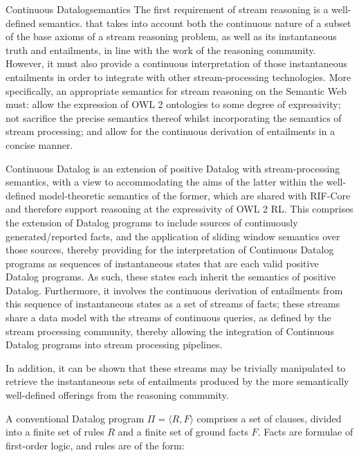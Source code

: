 \begin{nestedsection}{Continuous Datalog}{semantics}
The first requirement of stream reasoning is a well-defined semantics.
that takes into account both the continuous nature of a subset of the
base axioms of a stream reasoning problem, as well as its
instantaneous truth and entailments, in line with the work of the
reasoning community.  However, it must also provide a continuous
interpretation of those instantaneous entailments in order to
integrate with other stream-processing technologies.  More
specifically, an appropriate semantics for stream reasoning on the
Semantic Web must: allow the expression of OWL 2 ontologies to some
degree of expressivity; not sacrifice the precise semantics thereof
whilst incorporating the semantics of stream processing; and allow for
the continuous derivation of entailments in a concise manner.

Continuous Datalog is an extension of positive Datalog with
stream-processing semantics, with a view to accommodating the aims of
the latter within the well-defined model-theoretic semantics of the
former, which are shared with RIF-Core \cite{w3crifbld} and therefore
support reasoning at the expressivity of OWL 2 RL.  This comprises the
extension of Datalog programs to include sources of continuously
generated/reported facts, and the application of sliding window
semantics over those sources, thereby providing for the interpretation
of Continuous Datalog programs as sequences of instantaneous states
that are each valid positive Datalog programs.  As such, these states
each inherit the semantics of positive Datalog.  Furthermore, it
involves the continuous derivation of entailments from this sequence
of instantaneous states as a set of streams of facts; these streams
share a data model with the streams of continuous queries, as defined
by the stream processing community, thereby allowing the integration
of Continuous Datalog programs into stream processing pipelines.

In addition, it can be shown that these streams may be trivially
manipulated to retrieve the instantaneous sets of entailments produced
by the more semantically well-defined offerings from the reasoning
community.

\begin{definition}[Datalog]

A conventional Datalog program $\Pi = \langle R, F\rangle$ comprises a
set of clauses, divided into a finite set of rules $R$ and a finite
set of ground facts $F$. Facts are formulae of first-order logic, and
rules are of the form:


\end{definition}
\end{nestedsection}
